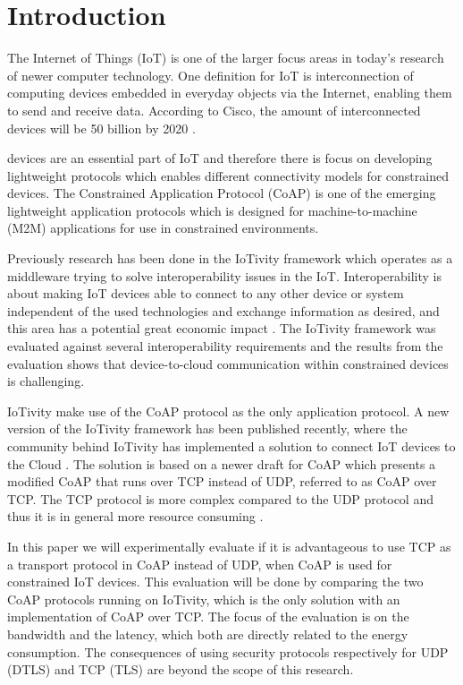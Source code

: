 \section{Introduction}{\label{sec:intro}}
The Internet of Things (IoT) is one of the larger focus areas in today's research of newer computer technology. One definition for IoT is interconnection of computing devices embedded in everyday objects via the Internet, enabling them to send and receive data. According to Cisco, the amount of interconnected devices will be 50 billion by 2020 \cite{ciscoiot:online} \cite{Inter74:online}.

 devices are an essential part of IoT and therefore there is focus on developing lightweight protocols which enables different connectivity models for constrained devices.  
The Constrained Application Protocol (CoAP) \cite{rfc7252} is one of the emerging lightweight application protocols which is designed for machine-to-machine (M2M) applications for use in constrained environments.   

Previously research has been done \cite{interoperabilityChallenge} in the IoTivity framework which operates as a middleware trying to solve interoperability issues in the IoT. Interoperability is about making IoT devices able to connect to any other device or system independent of the used technologies and exchange information as desired, and this area has a potential great economic impact \cite{Unloc34:online}. The IoTivity framework was evaluated against several interoperability requirements and the results from the evaluation shows that device-to-cloud communication within constrained devices is challenging.

IoTivity make use of the CoAP protocol as the only application protocol. 
A new version of the IoTivity framework has been published recently, where the community behind IoTivity has implemented a solution to connect IoT devices to the Cloud \cite{IoTiv3:online}. The solution is based on a newer draft for CoAP \cite{ietf-core-coap-tcp-tls-02} which presents a modified CoAP that runs over TCP instead of UDP, referred to as CoAP over TCP.
The TCP protocol is more complex compared to the UDP protocol and thus it is in general more resource consuming \cite{giannoulis2009tcp}.


In this paper we will experimentally evaluate if it is advantageous to use TCP as a transport protocol in CoAP instead of UDP, when CoAP is used for constrained IoT devices.
This evaluation will be done by comparing the two CoAP protocols running on IoTivity, which is the only solution with an implementation of CoAP over TCP. The focus of the evaluation is on the bandwidth and the latency, which both are directly related to the energy consumption. The consequences of using security protocols respectively for UDP (DTLS) and TCP (TLS) are beyond the scope of this research.

